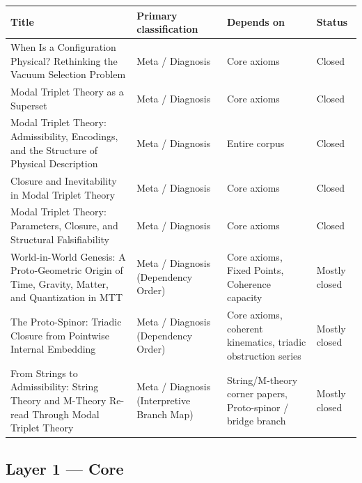 \documentclass[11pt]{article}
\begin{document}
\begin{center}
\small
\begin{tabular}{|p{7.2cm}|p{3.6cm}|p{3.6cm}|p{1.6cm}|}
\hline
\textbf{Title} & \textbf{Primary classification} & \textbf{Depends on} & \textbf{Status}\\
\hline
When Is a Configuration Physical? Rethinking the Vacuum Selection Problem
& Meta / Diagnosis & Core axioms & Closed\\
\hline
Modal Triplet Theory as a Superset
& Meta / Diagnosis & Core axioms & Closed\\
\hline
Modal Triplet Theory: Admissibility, Encodings, and the Structure of Physical Description
& Meta / Diagnosis & Entire corpus & Closed\\
\hline
Closure and Inevitability in Modal Triplet Theory &
Meta / Diagnosis & Core axioms & Closed \\
\hline
Modal Triplet Theory: Parameters, Closure, and Structural Falsifiability &
Meta / Diagnosis & Core axioms & Closed \\
\hline
World-in-World Genesis: A Proto-Geometric Origin of Time, Gravity, Matter, and Quantization in MTT
& Meta / Diagnosis (Dependency Order)
& Core axioms, Fixed Points, Coherence capacity
& Mostly closed\\
\hline
The Proto-Spinor: Triadic Closure from Pointwise Internal Embedding
& Meta / Diagnosis (Dependency Order)
& Core axioms, coherent kinematics, triadic obstruction series
& Mostly closed\\
\hline
From Strings to Admissibility: String Theory and M-Theory Re-read Through Modal Triplet Theory
& Meta / Diagnosis (Interpretive Branch Map)
& String/M-theory corner papers, Proto-spinor / bridge branch
& Mostly closed\\
\hline

\end{tabular}
\end{center}

\subsection{Layer 1 --- Core}
\end{document}
